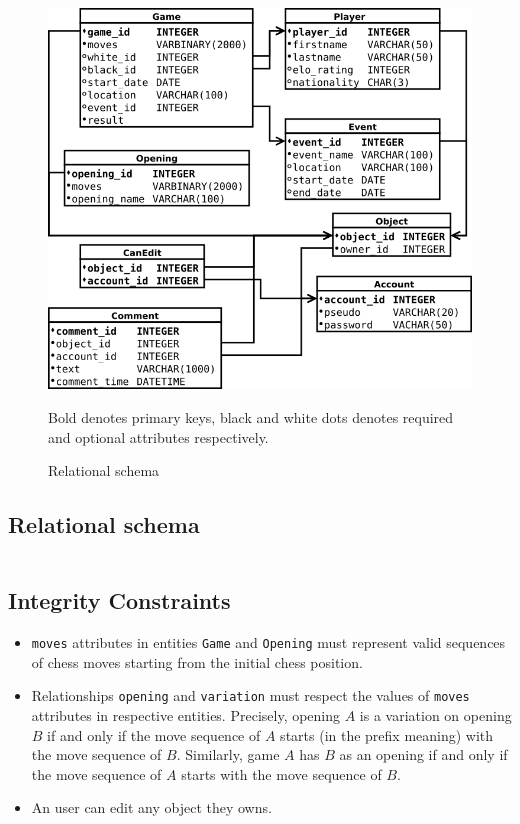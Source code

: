 \documentclass{article}
\begin{document}
\begin{figure}
\caption{Relational schema}
\label{db}
\begin{center}
\includegraphics[scale=0.6]{relational}
\end{center}
Bold denotes primary keys, black and white dots denotes required and optional attributes respectively.
\end{figure}


\subsection{Relational schema}
\begin{verbatim}

\end{verbatim}

\subsection{Integrity Constraints}
\begin{itemize}
\item \verb|moves| attributes in entities \verb|Game| and \verb|Opening| must represent
valid sequences of chess moves starting from the initial chess position.

\item Relationships \verb|opening| and \verb|variation| must respect the values of \verb|moves|
attributes in respective entities.
Precisely, opening $A$ is a variation on opening $B$ if and only if the move sequence
of $A$ starts (in the prefix meaning) with the move sequence of $B$.
Similarly, game $A$ has $B$ as an opening if and only if the move sequence of $A$ starts
with the move sequence of $B$.

\item An user can edit any object they owns.
\end{itemize}
\end{document}
